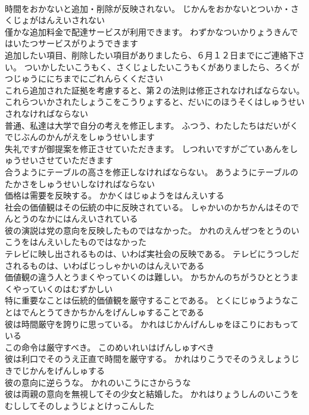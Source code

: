 \documentclass[8pt]{extreport}
\begin{document}
\begin{CJK}{UTF8}{min}
\\	時間をおかないと追加・削除が反映されない。	じかんをおかないとついか・さくじょがはんえいされない 
\\	僅かな追加料金で配達サービスが利用できます。	わずかなついかりょうきんではいたつサービスがりようできます 
\\	追加したい項目、削除したい項目がありましたら、６月１２日までにご連絡下さい。	ついかしたいこうもく、さくじょしたいこうもくがありましたら、ろくがつじゅうににちまでにごれんらくください 
\\	これら追加された証拠を考慮すると、第２の法則は修正されなければならない。	これらついかされたしょうこをこうりょすると、だいにのほうそくはしゅうせいされなければならない 
\\	普通、私達は大学で自分の考えを修正します。	ふつう、わたしたちはだいがくでじぶんのかんがえをしゅうせいします 
\\	失礼ですが御提案を修正させていただきます。	しつれいですがごていあんをしゅうせいさせていただきます 
\\	合うようにテーブルの高さを修正しなければならない。	あうようにテーブルのたかさをしゅうせいしなければならない 
\\	価格は需要を反映する。	かかくはじゅようをはんえいする 
\\	社会の価値観はその伝統の中に反映されている。	しゃかいのかちかんはそのでんとうのなかにはんえいされている 
\\	彼の演説は党の意向を反映したものではなかった。	かれのえんぜつをとうのいこうをはんえいしたものではなかった 
\\	テレビに映し出されるものは、いわば実社会の反映である。	テレビにうつしだされるものは、いわばじっしゃかいのはんえいである 
\\	価値観の違う人とうまくやっていくのは難しい。	かちかんのちがうひととうまくやっていくのはむずかしい 
\\	特に重要なことは伝統的価値観を厳守することである。	とくにじゅうようなことはでんとうてきかちかんをげんしゅすることである 
\\	彼は時間厳守を誇りに思っている。	かれはじかんげんしゅをほこりにおもっている 
\\	この命令は厳守すべき。	このめいれいはげんしゅすべき 
\\	彼は利口でそのうえ正直で時間を厳守する。	かれはりこうでそのうえしょうじきでじかんをげんしゅする 
\\	彼の意向に逆らうな。	かれのいこうにさからうな 
\\	彼は両親の意向を無視してその少女と結婚した。	かれはりょうしんのいこうをむししてそのしょうじょとけっこんした 

\end{CJK}
\end{document}
